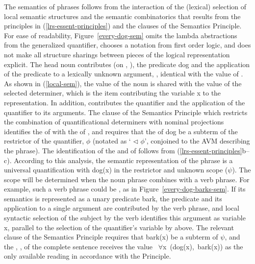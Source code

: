 \documentclass[output=paper,biblatex,babelshorthands,newtxmath,draftmode,colorlinks,citecolor=brown]{langscibook}
\begin{document}
\largerpage
The semantics of phrases follows from the interaction of the (lexical) selection of local semantic
structures and the semantic combinatorics that results from the principles in
(\ref{lrs-essent-principles}) and the clauses of the Semantics Principle.  For ease of readability,
Figure~\ref{every-dog-sem} omits the lambda abstractions from the generalized quantifier, chooses a
notation from first order logic, and does not make all structure sharings between pieces of the
logical representation explicit. The head noun  contributes (on ,
), the predicate {\normalfont \sffamily dog} and the application of the predicate to a
lexically unknown argument, , identical with the  value of . As shown
in (\ref{local-sem}), the  value of the noun is shared with the  value of the
selected determiner, which is the item contributing the variable {\normalfont \sffamily x} to the
representation. In addition,  contributes the quantifier and the application of the
quantifier to its arguments. The clause of the Semantics Principle which restricts the combination
of quantificational determiners with nominal projections identifies the  of 
with the  of , and requires that the  of dog  be a
subterm of the restrictor of the quantifier, $\phi$ (notated as ` $\triangleleft$ $\phi$',
conjoined to the AVM describing the phrase). The identification of the  and 
of  follows from (\ref{lrs-essent-principles}b--c). According to this analysis, the
semantic representation of the phrase  is a universal quantification with
{\normalfont \sffamily dog(x)} in the restrictor and unknown scope ($\psi$). The scope will be
determined when the noun phrase combines with a verb phrase. For example, such a verb phrase could
be , as in Figure~\ref{every-dog-barks-sem}. If its semantics is represented as a unary
predicate {\normalfont \sffamily bark}, the predicate and its application to a single argument are
contributed by the verb phrase, and local syntactic selection of the subject  by the
verb  identifies this argument as variable {\normalfont \sffamily x}, parallel to the
selection of the quantifier's variable by  above. The relevant clause of the Semantics
Principle requires that {\normalfont \sffamily bark(x)} be a subterm of $\psi$, and the
, , of the complete sentence receives the value \mbox{\normalfont \sffamily
  $\forall$x (dog(x), bark(x))} as the only available reading in accordance with the 
Principle.
\end{document}
